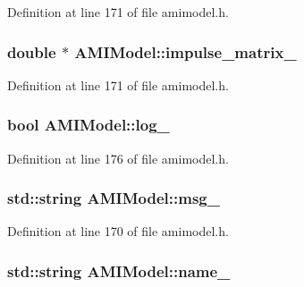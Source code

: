 Definition at line 171 of file amimodel.\+h.

\hypertarget{class_a_m_i_model_a26c35bff12c048655bdbd8663a2f0f58}{}
\subsubsection[{impulse\+\_\+matrix\+\_\+}]{\setlength{\rightskip}{0pt plus 5cm}double $\ast$ A\+M\+I\+Model\+::impulse\+\_\+matrix\+\_\+\hspace{0.3cm}{\ttfamily [protected]}}\label{class_a_m_i_model_a26c35bff12c048655bdbd8663a2f0f58}


Definition at line 171 of file amimodel.\+h.

\hypertarget{class_a_m_i_model_ae701c08f6c4b0d962df4a2f2dcb6196b}{}
\subsubsection[{log\+\_\+}]{\setlength{\rightskip}{0pt plus 5cm}bool A\+M\+I\+Model\+::log\+\_\+\hspace{0.3cm}{\ttfamily [protected]}}\label{class_a_m_i_model_ae701c08f6c4b0d962df4a2f2dcb6196b}


Definition at line 176 of file amimodel.\+h.

\hypertarget{class_a_m_i_model_acc9d4703088b0a69f649c84a1e134cfd}{}
\subsubsection[{msg\+\_\+}]{\setlength{\rightskip}{0pt plus 5cm}std\+::string A\+M\+I\+Model\+::msg\+\_\+\hspace{0.3cm}{\ttfamily [protected]}}\label{class_a_m_i_model_acc9d4703088b0a69f649c84a1e134cfd}


Definition at line 170 of file amimodel.\+h.

\hypertarget{class_a_m_i_model_a42e00992da9baf93d81d1d9fcd32d8e6}{}
\subsubsection[{name\+\_\+}]{\setlength{\rightskip}{0pt plus 5cm}std\+::string A\+M\+I\+Model\+::name\+\_\+\hspace{0.3cm}{\ttfamily [protected]}}\label{class_a_m_i_model_a42e00992da9baf93d81d1d9fcd32d8e6}


